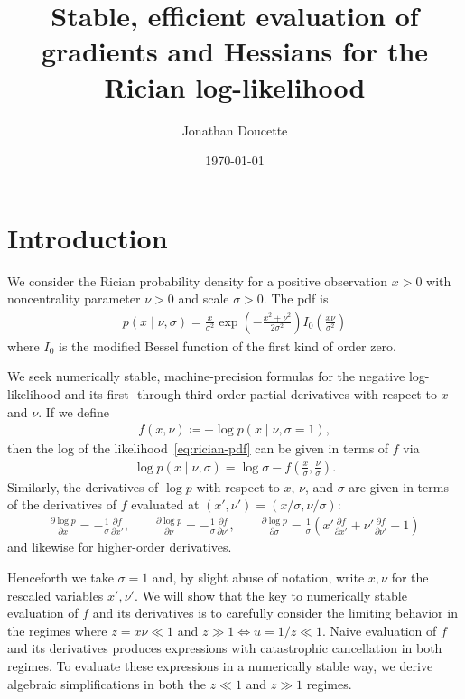 \documentclass{article}
\title{Stable, efficient evaluation of gradients and Hessians for the Rician log-likelihood}
\author{Jonathan Doucette}
\date{\today}
\begin{document}
\maketitle

\section{Introduction}

We consider the Rician probability density for a positive observation $x>0$ with noncentrality parameter $\nu>0$ and scale $\sigma>0$.
The pdf is
%
\begin{align}
  p(x \mid \nu, \sigma) = \frac{x}{\sigma^2} \exp\left(-\frac{x^2+\nu^2}{2\sigma^2}\right) I_0\left(\frac{x\nu}{\sigma^2}\right) \label{eq:rician-pdf}
\end{align}
%
where $I_0$ is the modified Bessel function of the first kind of order zero.

We seek numerically stable, machine-precision formulas for the negative log-likelihood and its first- through third-order partial derivatives with respect to $x$ and $\nu$.
If we define
%
\begin{align}
  f(x, \nu) \coloneqq -\log p(x \mid \nu, \sigma = 1),
\end{align}
%
then the log of the likelihood~\eqref{eq:rician-pdf} can be given in terms of $f$ via
%
\begin{align}
  \log p(x \mid \nu, \sigma) = \log\sigma - f\left(\frac{x}{\sigma}, \frac{\nu}{\sigma}\right).
\end{align}
%
Similarly, the derivatives of $\log p$ with respect to $x$, $\nu$, and $\sigma$ are given in terms of the derivatives of $f$ evaluated at $(x', \nu') = (x / \sigma, \nu / \sigma)$:
%
\begin{align}
  \frac{\partial \log p}{\partial x}      = -\frac{1}{\sigma} \frac{\partial f}{\partial x'},                                                                                        \qquad
  \frac{\partial \log p}{\partial \nu}    = -\frac{1}{\sigma} \frac{\partial f}{\partial \nu'},                                                                                      \qquad
  \frac{\partial \log p}{\partial \sigma} = \frac{1}{\sigma} \left( x' \frac{\partial f}{\partial x'} + \nu' \frac{\partial f}{\partial \nu'} - 1 \right)
\end{align}
%
and likewise for higher-order derivatives.

Henceforth we take $\sigma=1$ and, by slight abuse of notation, write $x, \nu$ for the rescaled variables $x', \nu'$.
We will show that the key to numerically stable evaluation of $f$ and its derivatives is to carefully consider the limiting behavior in the regimes where $z = x\nu \ll 1$ and $z \gg 1 \Leftrightarrow u=1/z \ll 1$.
Naive evaluation of $f$ and its derivatives produces expressions with catastrophic cancellation in both regimes.
To evaluate these expressions in a numerically stable way, we derive algebraic simplifications in both the $z \ll 1$ and $z \gg 1$ regimes.
\end{document}
